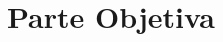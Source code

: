 \documentclass[a4paper,12pt]{article}
\begin{document}
\newpage

\tableofcontents

\newpage

\part{Parte Objetiva}

\newpage











    















\end{document}
